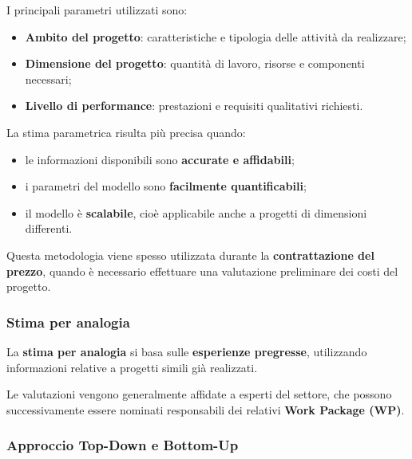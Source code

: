 \medskip

\noindent I principali parametri utilizzati sono:

\begin{itemize}
    \item \textbf{Ambito del progetto}: caratteristiche
    e tipologia delle attività da realizzare;

    \item \textbf{Dimensione del progetto}: quantità
    di lavoro, risorse e componenti necessari;

    \item \textbf{Livello di performance}: prestazioni
    e requisiti qualitativi richiesti.
\end{itemize}

\noindent La stima parametrica risulta più precisa quando:

\begin{itemize}
    \item le informazioni disponibili sono \textbf{accurate e affidabili};

    \item i parametri del modello sono \textbf{facilmente quantificabili};

    \item il modello è \textbf{scalabile}, cioè applicabile
    anche a progetti di dimensioni differenti.
\end{itemize}

\noindent Questa metodologia viene spesso utilizzata
durante la \textbf{contrattazione del prezzo},
quando è necessario effettuare una valutazione preliminare
dei costi del progetto.

\subsubsection*{Stima per analogia}

\noindent La \textbf{stima per analogia} si basa sulle
\textbf{esperienze pregresse}, utilizzando informazioni
relative a progetti simili già realizzati.

\medskip

\noindent Le valutazioni vengono generalmente affidate
a esperti del settore, che possono successivamente
essere nominati responsabili dei relativi
\textbf{Work Package (WP)}.


\subsubsection*{Approccio Top-Down e Bottom-Up}

